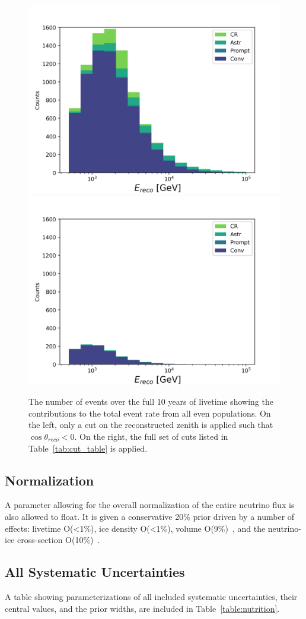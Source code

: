 \documentclass[main.tex]{subfiles}
\begin{document}
\begin{figure}
    \centering
    \includegraphics[width=0.45\linewidth]{figures/zenith_only_cut.png}%
    \includegraphics[width=0.45\linewidth]{figures/all_cuts.png}
    \caption{The number of events over the full 10 years of livetime showing the contributions to the total event rate from all even populations. On the left, only a cut on the reconstructed zenith is applied such that $\cos\theta_{reco}<0$. On the right, the full set of cuts listed in Table~\ref{tab:cut_table} is applied. }\label{fig:cut_figure}
\end{figure}

\subsection{Normalization}

A parameter allowing for the overall normalization of the entire neutrino flux is also allowed to float. It is given a conservative 20\% prior driven by a number of effects: livetime O(<1\%), ice density O(<1\%), volume O(9\%)~\cite{Sandrock_2020}, and the neutrino-ice cross-section O(10\%)~\cite{candido2023neutrino}.

\subsection{All Systematic Uncertainties}

A table showing parameterizations of all included systematic uncertainties, their central values, and the prior widths, are included in Table~\ref{table:nutrition}.
\end{document}
